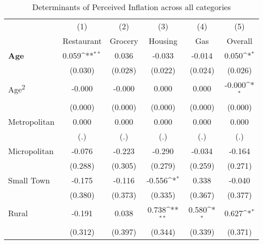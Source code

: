 \begin{table}[htbp]\centering
\def\sym#1{\ifmmode^{#1}\else\(^{#1}\)\fi}
\caption{Determinants of Perceived Inflation across all categories}
\begin{tabular}{l*{5}{c}}
\hline\hline
                    &\multicolumn{1}{c}{(1)}&\multicolumn{1}{c}{(2)}&\multicolumn{1}{c}{(3)}&\multicolumn{1}{c}{(4)}&\multicolumn{1}{c}{(5)}\\
                    &\multicolumn{1}{c}{Restaurant}&\multicolumn{1}{c}{Grocery}&\multicolumn{1}{c}{Housing}&\multicolumn{1}{c}{Gas}&\multicolumn{1}{c}{Overall}\\
\hline
\textbf{Age}        &       0.059\sym{**} &       0.036         &      -0.033         &      -0.014         &       0.050\sym{*}  \\
                    &     (0.030)         &     (0.028)         &     (0.022)         &     (0.024)         &     (0.026)         \\
Age\textsuperscript{2}&      -0.000         &      -0.000         &       0.000         &       0.000         &      -0.000\sym{*}  \\
                    &     (0.000)         &     (0.000)         &     (0.000)         &     (0.000)         &     (0.000)         \\
Metropolitan        &       0.000         &       0.000         &       0.000         &       0.000         &       0.000         \\
                    &         (.)         &         (.)         &         (.)         &         (.)         &         (.)         \\
Micropolitan        &      -0.076         &      -0.223         &      -0.290         &      -0.034         &      -0.164         \\
                    &     (0.288)         &     (0.305)         &     (0.279)         &     (0.259)         &     (0.271)         \\
Small Town          &      -0.175         &      -0.116         &      -0.556\sym{*}  &       0.338         &      -0.040         \\
                    &     (0.380)         &     (0.373)         &     (0.335)         &     (0.367)         &     (0.377)         \\
Rural               &      -0.191         &       0.038         &       0.738\sym{**} &       0.580\sym{*}  &       0.627\sym{*}  \\
                    &     (0.312)         &     (0.397)         &     (0.344)         &     (0.339)         &     (0.371)         \\

\end{tabular}
\end{table}
